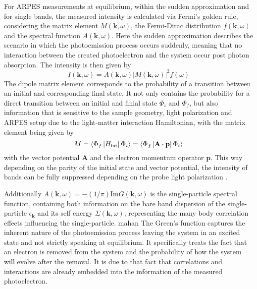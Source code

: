 For ARPES measurements at equilibrium, within the sudden approximation and for single bands, the measured intensity is calculated via Fermi's golden rule, considering the matrix element $M(\mathbf{k}, \omega)$, the Fermi-Dirac distribution $f(\mathbf{k}, \omega)$ and the spectral function $A(\mathbf{k}, \omega)$.
Here the sudden approximation describes the scenario in which the photoemission process occurs suddenly, meaning that no interaction between the created photoelectron and the system occur post photon absorption.
The intensity is then given by
\begin{equation}
	I(\mathbf{k}, \omega) = A(\mathbf{k}, \omega)\left|M(\mathbf{k}, \omega)\right|^2f(\omega)
	\label{eq:arpes_signal}
\end{equation}
The dipole matrix element corresponds to the probability of a transition between an initial and corresponding final state.
It not only contains the probability for a direct transition between an initial and finial state $\Phi_i$ and $\Phi_f$, but also information that is sensitive to the sample geometry, light polarization and ARPES setup due to the light-matter interaction Hamiltonian,
with the matrix element being given by
\begin{equation}
	M = \braket{\Phi_f\left|H_\text{int}\right|\Phi_i} =\braket{\Phi_f\left| \mathbf{A} \cdot \mathbf{p} \right|\Phi_i}
\end{equation}
with the vector potential $\mathbf{A}$ and the electron momentum operator $\mathbf{p}$.
This way depending on the parity of the initial state and vector potential, the intensity of bands can be fully suppressed depending on the probe light polarization \cite{}.

Additionally $A(\mathbf{k}, \omega)=-(1/\pi)\text{Im}G(\mathbf{k}, \omega)$ is the single-particle spectral function, containing both information on the bare band dispersion of the single-particle $\epsilon_\mathbf{k}$ and its self energy $\Sigma(\mathbf{k}, \omega)$, representing the many body correlation effects influencing the single-particle. \cite{} mahan
The Green's function captures the inherent nature of the photoemission process leaving the system in an excited state and not strictly speaking at equilibrium.
It specifically treats the fact that an electron is removed from the system and the probability of how the system will evolve after the removal.
It is due to that fact that correlations and interactions are already embedded into the information of the measured photoelectron.

